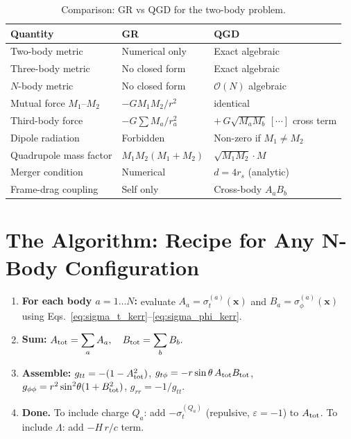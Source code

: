 \documentclass[11pt,a4paper]{article}
\theoremstyle{definition}
\theoremstyle{remark}
\newcommand{\sig}[2]{\sigma_{#1}^{(#2)}}
\newcommand{\boldx}{\mathbf{x}}
\begin{document}
	\begin{table}[ht]
		\centering
		\caption{Comparison: GR vs QGD for the two-body problem.}
		\label{tab:comparison}
		\renewcommand{\arraystretch}{1.5}
		\begin{tabular}{lll}
			\toprule
			Quantity & GR & QGD\\
			\midrule
			Two-body metric & Numerical only & Exact algebraic\\
			Three-body metric & No closed form & Exact algebraic\\
			$N$-body metric & No closed form & $\mathcal{O}(N)$ algebraic\\
			Mutual force $M_1$--$M_2$ & $-GM_1M_2/r^2$ & identical\\
			Third-body force & $-G\sum M_a/r_a^2$ & $+\,G\sqrt{M_aM_b}\,[\cdots]$ cross term\\
			Dipole radiation & Forbidden & Non-zero if $M_1\ne M_2$\\
			Quadrupole mass factor & $M_1M_2(M_1+M_2)$ & $\sqrt{M_1M_2}\cdot M$\\
			Merger condition & Numerical & $d=4r_s$ (analytic)\\
			Frame-drag coupling & Self only & Cross-body $A_aB_b$\\
			\bottomrule
		\end{tabular}
	\end{table}
	
	\section{The Algorithm: Recipe for Any N-Body Configuration}
	\label{sec:algorithm}
		\begin{enumerate}
			\item \textbf{For each body $a=1\ldots N$:} evaluate
			$A_a=\sig{t}{a}(\boldx)$ and $B_a=\sig{\phi}{a}(\boldx)$
			using Eqs.~\eqref{eq:sigma_t_kerr}--\eqref{eq:sigma_phi_kerr}.
			
			\item \textbf{Sum:}
			$\displaystyle A_{\rm tot}=\sum_a A_a,\quad
			B_{\rm tot}=\sum_b B_b.$
			
			\item \textbf{Assemble:}
			$g_{tt}=-(1-A_{\rm tot}^2)$,\quad
			$g_{t\phi}=-r\sin\theta\,A_{\rm tot}B_{\rm tot}$,\quad
			$g_{\phi\phi}=r^2\sin^2\!\theta(1+B_{\rm tot}^2)$,\quad
			$g_{rr}=-1/g_{tt}$.
			
			\item \textbf{Done.} To include charge $Q_a$: add
			$-\sig{t}{Q_a}$ (repulsive, $\varepsilon=-1$) to $A_{\rm tot}$.
			To include $\Lambda$: add $-H\,r/c$ term.
		\end{enumerate}
	
\end{document}
